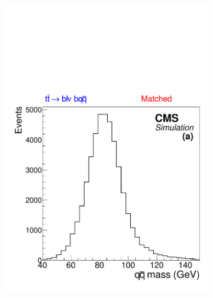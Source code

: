 \begin{figure}[tb]
  \begin{subfigure}{0.33\textwidth}
    \centering
    \includegraphics[width=\textwidth]{figures/dijet-matched}
    \caption{}
    \label{sfig:matched}
  \end{subfigure}%
  \begin{subfigure}{0.33\textwidth}
    \centering

\end{subfigure}
\end{figure}
